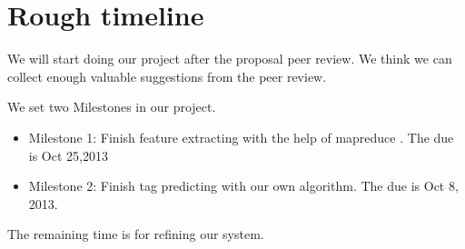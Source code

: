 \documentclass[11pt]{article} %
\begin{document}
\section{Rough timeline}

We will start doing our project after the proposal peer review. We think we can collect enough valuable suggestions from the peer review.

We set two Milestones in our project.

\begin{itemize}
\item Milestone 1: Finish feature extracting with the help of mapreduce \cite{dean2008mapreduce}. The due is Oct 25,2013
\item Milestone 2: Finish tag predicting with our own algorithm. The due is Oct 8, 2013.
\end{itemize}

The remaining time is for refining our system.




\end{document}
